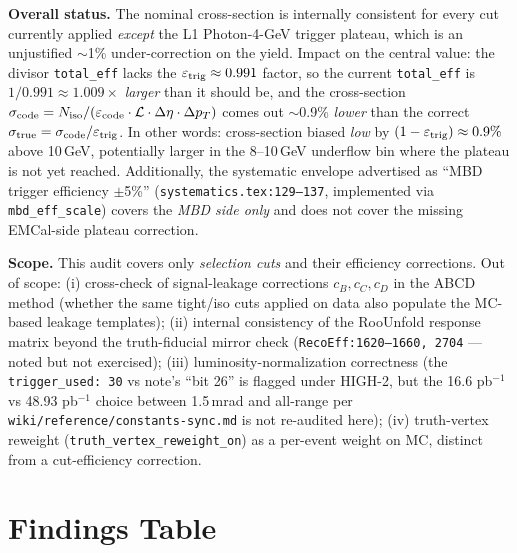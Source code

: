 \documentclass[11pt,a4paper]{article}
\begin{document}
\noindent\textbf{Overall status.} The nominal cross-section is
internally consistent for every cut currently applied \emph{except} the
L1 Photon-4-GeV trigger plateau, which is an unjustified $\sim$1\%
under-correction on the yield. Impact on the central value:
the divisor \texttt{total\_eff} lacks the $\varepsilon_{\rm trig}
\approx 0.991$ factor, so the current \texttt{total\_eff} is
$1/0.991 \approx 1.009\times$ \emph{larger} than it should be, and the
cross-section $\sigma_{\rm code} = N_{\rm iso}/(\varepsilon_{\rm code}
\cdot\mathcal{L}\cdot\Delta\eta\cdot\Delta p_T)$ comes out
$\sim$0.9\% \emph{lower} than the correct
$\sigma_{\rm true} = \sigma_{\rm code}/\varepsilon_{\rm trig}$. In
other words: cross-section biased \emph{low} by $(1-\varepsilon_{\rm trig})
\approx 0.9\%$ above 10\,GeV, potentially larger in the 8--10\,GeV
underflow bin where the plateau is not yet reached.
Additionally, the systematic envelope advertised as ``MBD trigger
efficiency $\pm$5\%'' (\texttt{systematics.tex:129--137}, implemented via
\texttt{mbd\_eff\_scale}) covers the \emph{MBD side only} and does not
cover the missing EMCal-side plateau correction.

\medskip
\noindent\textbf{Scope.} This audit covers only \emph{selection cuts}
and their efficiency corrections. Out of scope: (i) cross-check of
signal-leakage corrections $c_B, c_C, c_D$ in the ABCD method (whether
the same tight/iso cuts applied on data also populate the MC-based
leakage templates); (ii) internal consistency of the RooUnfold response
matrix beyond the truth-fiducial mirror check
(\texttt{RecoEff:1620--1660, 2704} --- noted but not exercised);
(iii) luminosity-normalization correctness (the \texttt{trigger\_used:
30} vs note's ``bit 26'' is flagged under HIGH-2, but the 16.6 pb$^{-1}$
vs 48.93 pb$^{-1}$ choice between 1.5\,mrad and all-range per
\texttt{wiki/reference/constants-sync.md} is not re-audited here);
(iv) truth-vertex reweight (\texttt{truth\_vertex\_reweight\_on}) as a
per-event weight on MC, distinct from a cut-efficiency correction.

\section{Findings Table}
\end{document}
